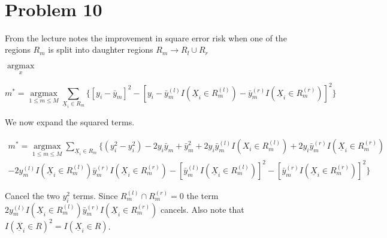 \documentclass[11pt]{article}
\begin{document}
\begin{center}

\ \\
\end{center}
\section*{Problem 10}
\setlength{\parindent}{0pt}

From the lecture notes the improvement in square error risk when one of the regions $R_m$ is split into daughter regions $R_m \to R_l \cup R_r$

$\underset{x}{\operatorname{argmax}}$

\begin{equation}
m^* = \underset{1 \leq m \leq M}{\operatorname{argmax}} \sum_{\underline{X}_i \in R_m} \{[y_i-\bar{y}_m]^2-[y_i - \bar{y}_m^{(l)}I(\underline{X}_i \in R_m^{(l)})-\bar{y}_m^{(r)}I(\underline{X}_i \in R_m^{(r)})]^2\}
\end{equation}

We now expand the squared terms. 

\begin{equation}
\begin{split}
m^* = \underset{1 \leq m \leq M}{\operatorname{argmax}} \sum_{\underline{X}_i \in R_m} \{(y_i^2-y_i^2) -2y_i\bar{y}_m + \bar{y}_m^2 +2y_i\bar{y}_m^{(l)}I(X_i \in R_m^{(l)}) +2y_i\bar{y}_m^{(r)}I(\underline{X}_i \in R_m^{(r)}) \\- 2y_m^{(l)}I(\underline{X}_i \in R_m^{(l)})\bar{y}_m^{(r)}I(\underline{X}_i \in R_m^{(r)})-[\bar{y}_m^{(l)}I(\underline{X}_i \in R_m^{(l)})]^2-[\bar{y}_m^{(r)}I(\underline{X}_i \in R_m^{(r)})]^2\}
\end{split}
\end{equation}

Cancel the two $y_i^2$ terms. Since $R_m^{(l)} \cap R_m^{(r)} = 0$ the term  $2y_m^{(l)}I(\underline{X}_i \in R_m^{(l)})\bar{y}_m^{(r)}I(\underline{X}_i \in R_m^{(r)})$ cancels. Also note that $I(\underline{X}_i \in R)^2 = I(\underline{X}_i \in R)$.
\end{document}
